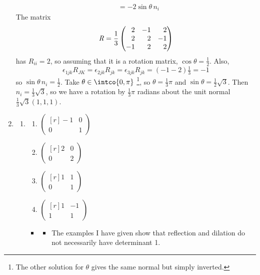 \documentclass[fleqn,a4paper,11pt]{article}
\begin{document}
\begin{enumerate}[label=\textbf{\arabic*.}]
\begin{align*}
      &= - 2 \sin\theta\,n_i
    \end{align*}
    The matrix
    \begin{equation*}
     \mat R = \frac 13
     \begin{pmatrix*}[r]
      2 & -1 & 2 \\
      2 & 2 & -1 \\
      -1 & 2 & 2
     \end{pmatrix*}
    \end{equation*}
    has \(R_{ii} = 2\), so assuming that it is a rotation matrix,
    \(\cos \theta = \frac 12\). Also,
    \begin{equation*}
     \epsilon_{1jk} R_{JK} = \epsilon_{2jk} R_{jk} = \epsilon_{3jk} R_{jk}
      = (-1 - 2) \tfrac 13 = -1
    \end{equation*}
    so \(\sin\theta\,n_i = \frac 12\). Take \(\theta \in \intco{0, \pi}\)
    \footnote{
    The other solution for \(\theta\) gives the same normal but simply inverted.
    }, so
    \(\theta = \frac 13 \pi\) and \(\sin\theta = \frac 12 \sqrt 3\). Then
    \(n_i = \frac 13 \sqrt 3\), so we have a rotation by \(\frac 13 \pi\)
    radians about the unit normal \(\frac 13 \sqrt 3(1, 1, 1)\).
   \item
    \begin{enumerate}[label=(\alph*)]
     \item
      \begin{enumerate}[label=(\roman*)]
       \item \(
        \begin{pmatrix*}[r]
         -1 & 0 \\
         0 & 1
        \end{pmatrix*} \)
       \item \(
        \begin{pmatrix*}[r]
         2 & 0 \\
         0 & 2
        \end{pmatrix*} \)
       \item \(
        \begin{pmatrix*}[r]
         1 & 1 \\
         0 & 1
        \end{pmatrix*} \)
       \item \(
        \begin{pmatrix*}[r]
         1 & -1 \\
         1 & 1
        \end{pmatrix*} \)
      \end{enumerate}
      \begin{itemize}
       \item
        \begin{itemize}
         \item The examples I have given show that reflection and dilation do
               not necessarily have determinant 1.


\end{itemize}
\end{itemize}
\end{enumerate}
\end{enumerate}
\end{document}
